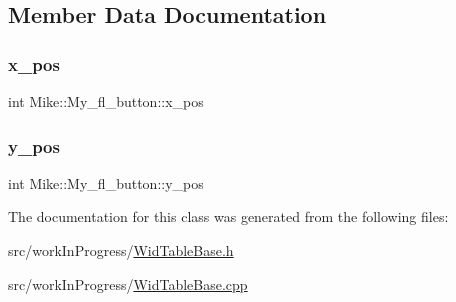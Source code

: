 \subsection{Member Data Documentation}
\mbox{\label{class_mike_1_1_my__fl__button_aabe7efb74bd537b378072d3f1e921a72}} 
\subsubsection{\texorpdfstring{x\+\_\+pos}{x\_pos}}
{\footnotesize\ttfamily int Mike\+::\+My\+\_\+fl\+\_\+button\+::x\+\_\+pos\hspace{0.3cm}{\ttfamily [protected]}}

\mbox{\label{class_mike_1_1_my__fl__button_ad7b1b7c9d613dc8813fd3439b04755cf}} 
\subsubsection{\texorpdfstring{y\+\_\+pos}{y\_pos}}
{\footnotesize\ttfamily int Mike\+::\+My\+\_\+fl\+\_\+button\+::y\+\_\+pos}



The documentation for this class was generated from the following files\+:\begin{DoxyCompactItemize}
\item 
src/work\+In\+Progress/\hyperlink{_wid_table_base_8h}{Wid\+Table\+Base.\+h}\item 
src/work\+In\+Progress/\hyperlink{_wid_table_base_8cpp}{Wid\+Table\+Base.\+cpp}\end{DoxyCompactItemize}
